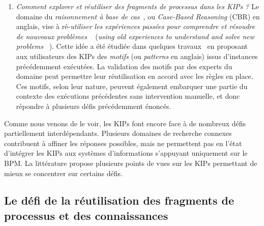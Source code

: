 \begin{enumerate}
\item \og \textit{Comment explorer et réutiliser des fragments de processus dans les KIPs ?} \fg
Le domaine du \textit{raisonnement à base de cas}~\cite{slade1991case}, ou \textit{Case-Based Reasoning} (CBR) en anglais, vise à ré-\og \textit{utiliser les expériences passées pour comprendre et résoudre de nouveaux problèmes} \fg~\cite{kolodner1992introduction} (\og \textit{using old experiences to understand and solve new problems} \fg~\cite{kolodner1992introduction}).
Cette idée a été étudiée dans quelques travaux~\cite{di2015knowledge}\cite{cognini2016case} en proposant aux utilisateurs des KIPs des \textit{motifs} (ou \textit{patterns} en anglais) issus d'instances précédemment exécutées.
La validation des motifs par des experts du domaine peut permettre leur réutilisation en accord avec les règles en place.
Ces motifs, selon leur nature, peuvent également embarquer une partie du contexte des exécutions précédentes sans intervention manuelle, et donc répondre à plusieurs défis précédemment énoncés.\\

\end{enumerate}

\bigskip

Comme nous venons de le voir, les KIPs font encore face à de nombreux défis partiellement interdépendants.
Plusieurs domaines de recherche connexes contribuent à affiner les réponses possibles, mais ne permettent pas en l'état d'intégrer les KIPs aux systèmes d'informations s'appuyant uniquement sur le BPM.
La littérature propose plusieurs points de vues sur les KIPs permettant de mieux se concentrer sur certains défis.



\bigskip


\subsection{Le défi de la réutilisation des fragments de processus et des connaissances}
\label{subsection:Contexte:KIP-RevueLitterature:Reutilisation}

